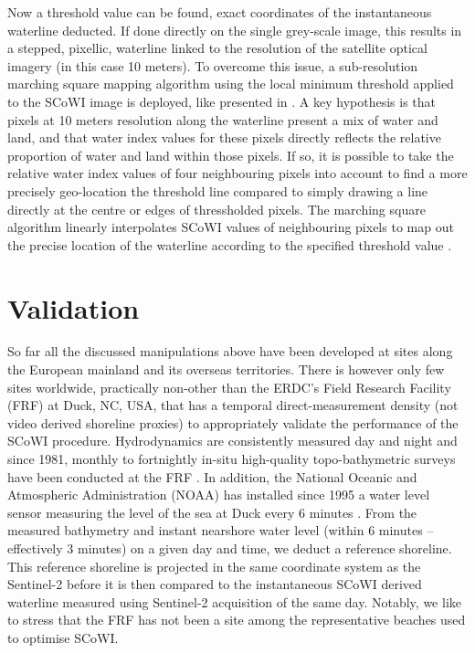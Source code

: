 \documentclass[remotesensing,article,submit,pdftex,moreauthors]{Definitions/mdpi}
\begin{document}
Now a threshold value can be found, exact coordinates of the instantaneous waterline deducted. If done directly on the single grey-scale image, this results in a stepped, pixellic, waterline linked to the resolution of the satellite optical imagery (in this case 10 meters). To overcome this issue, a sub-resolution marching square mapping algorithm using the local minimum threshold applied to the SCoWI image is deployed, like presented in \citet{VOS2019_sub}. A key hypothesis is that pixels at 10 meters resolution along the waterline present a mix of water and land, and that water index values for these pixels directly reflects the relative proportion of water and land within those pixels. If so, it is possible to take the relative water index values of four neighbouring pixels into account to find a more precisely geo-location the threshold line compared to simply drawing a line directly at the centre or edges of thressholded pixels. The marching square algorithm linearly interpolates SCoWI values of neighbouring pixels to map out the precise location of the waterline according to the specified threshold value \citep{CIPOLLETTI201287}.

\section{Validation}
So far all the discussed manipulations above have been developed at sites along the European mainland and its overseas territories. There is however only few sites worldwide, practically non-other than the ERDC's Field Research Facility (FRF) at Duck, NC, USA, that has a temporal direct-measurement density (not video derived shoreline proxies) to appropriately validate the performance of the SCoWI procedure. Hydrodynamics are consistently measured day and night and since 1981, monthly to fortnightly in-situ high-quality topo-bathymetric surveys have been conducted at the FRF \citep{FORTE2017}. In addition, the National Oceanic and Atmospheric Administration (NOAA) has installed since 1995 a water level sensor measuring the level of the sea at Duck every 6 minutes \citep{park2014water}. From the measured bathymetry and instant nearshore water level (within 6 minutes -- effectively 3 minutes) on a given day and time, we deduct a reference shoreline. This reference shoreline is projected in the same coordinate system as the Sentinel-2 before it is then compared to the instantaneous SCoWI derived waterline measured using Sentinel-2 acquisition of the same day. Notably, we like to stress that the FRF has not been a site among the representative beaches used to optimise SCoWI.
\end{document}

